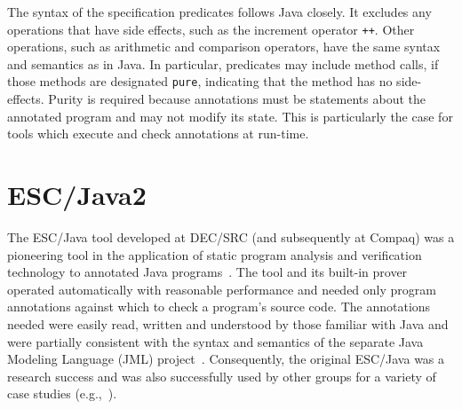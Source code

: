 \documentclass{sig-alternate}
\begin{document}
The syntax of the specification predicates follows Java closely.  It excludes any operations 
that have side effects, such as the increment operator
 \texttt{++}.  Other operations, such as arithmetic and 
comparison operators, have the same syntax and semantics as in Java.  In particular, 
predicates may include method calls, if those methods are designated \texttt{pure},
indicating that the method has no side-effects.  Purity is
required because annotations must be statements
about the annotated program and may not modify its state.  This is particularly the case for
tools which execute and check annotations at run-time.

\section{ESC/Java2}

The ESC/Java tool developed at DEC/SRC 
(and subsequently at Compaq) was a pioneering tool in the
application of static program analysis and verification technology to
annotated Java programs~\cite{Flanagan-etal02}.  The tool and its built-in
prover operated automatically with reasonable performance and needed
only program annotations against which to check a program's source
code.  The annotations needed were easily read, written and understood
by those familiar with Java and were partially consistent with the syntax
and semantics of the separate Java Modeling Language (JML)
project~\cite{jmlpapers,Leavens-etal00}.  Consequently, the original
ESC/Java was a research success
and was also successfully used by other groups for a variety of case
studies (e.g.,~\cite{Hub03,HOP04}).
\end{document}
